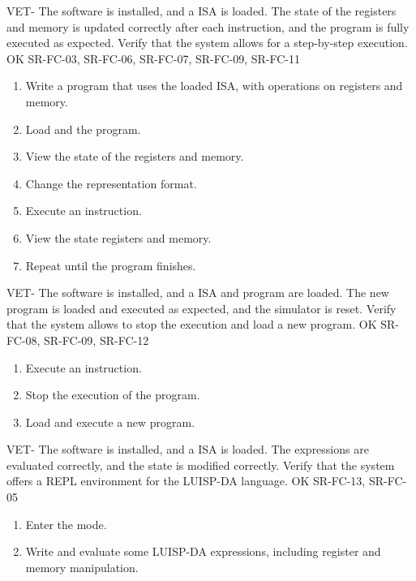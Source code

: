 \begin{testCase}{VET-}
  {The software is installed, and a \gls{ISA} is loaded.}  %
  {The state of the \glspl{register} and \gls{memory} is updated correctly after each instruction, and the program is fully executed as expected.}  %
  {Verify that the system allows for a step-by-step execution.}  %
  {OK}  %
  {SR-FC-03, SR-FC-06, SR-FC-07, SR-FC-09, SR-FC-11}  %
  \begin{enumerate}[leftmargin=*, topsep=0pt, noitemsep]  %
    \item Write a program that uses the loaded \gls{ISA}, with operations on \glspl{register} and \gls{memory}.
    \item Load and the program.
    \item View the state of the \glspl{register} and \gls{memory}.
    \item Change the representation format.
    \item Execute an instruction.
    \item View the state \glspl{register} and \gls{memory}.
    \item Repeat until the program finishes.
  \end{enumerate}
\end{testCase}

\begin{testCase}{VET-}
  {The software is installed, and a \gls{ISA} and program are loaded.}  %
  {The new program is loaded and executed as expected, and the simulator is reset.}  %
  {Verify that the system allows to stop the execution and load a new program.}  %
  {OK}  %
  {SR-FC-08, SR-FC-09, SR-FC-12}  %
  \begin{enumerate}[leftmargin=*, topsep=0pt, noitemsep]  %
    \item Execute an instruction.
    \item Stop the execution of the program.
    \item Load and execute a new program.
  \end{enumerate}
\end{testCase}

\begin{testCase}{VET-}
  {The software is installed, and a \gls{ISA} is loaded.}  %
  {The expressions are evaluated correctly, and the state is modified correctly.}  %
  {Verify that the system offers a \gls{REPL environment} for the LUISP-DA language.}  %
  {OK}  %
  {SR-FC-13, SR-FC-05}  %
  \begin{enumerate}[leftmargin=*, topsep=0pt, noitemsep]  %
    \item Enter the  mode.
    \item Write and evaluate some LUISP-DA expressions, including \gls{register} and \gls{memory} manipulation.
  \end{enumerate}
\end{testCase}

